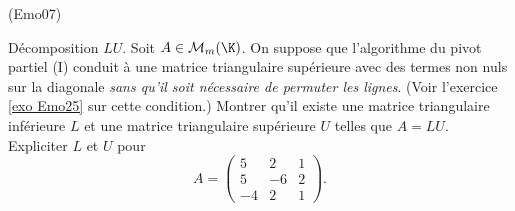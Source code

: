 \begin{tiny}(Emo07)\end{tiny} D{\'e}composition $LU$.\label{exo Emo07}\newline
Soit $A\in \mathcal{M}_{m}(\K)$. On suppose que l'algorithme du pivot partiel (I) conduit {\`a} une matrice triangulaire sup{\'e}rieure avec des termes non nuls sur la diagonale \emph{sans qu'il soit n{\'e}cessaire de permuter les lignes}. (Voir l'exercice \ref{exo Emo25} sur cette condition.)\newline
Montrer qu'il existe une matrice triangulaire inf{\'e}rieure $L$ et une matrice triangulaire sup{\'e}rieure $U$  telles que $A=LU$. Expliciter $L$ et $U$ pour
\begin{displaymath}
A=\begin{pmatrix}
5 & 2 & 1 \\
5 & -6 & 2 \\
-4 & 2 & 1    
  \end{pmatrix}.
\end{displaymath}

